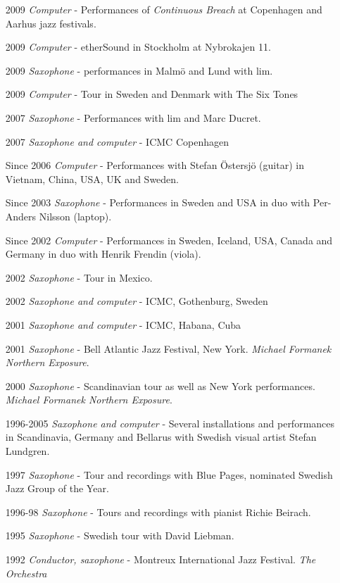\begin{enumerate}
\item [2009] \emph{Computer} - Performances of \emph{Continuous Breach} at Copenhagen and Aarhus jazz festivals.
\item [2009] \emph{Computer} - etherSound in Stockholm at Nybrokajen 11.
\item [2009] \emph{Saxophone} - performances in Malm\"o and Lund with lim.
\item [2009] \emph{Computer} - Tour in Sweden and Denmark with The Six Tones
\item [2007] \emph{Saxophone} - Performances with lim and Marc Ducret. 
\item [2007] \emph{Saxophone and computer} - ICMC Copenhagen
 \item[Since 2006] \emph{Computer} - Performances with Stefan \"Ostersj\"o (guitar) in Vietnam, China, USA, UK and Sweden.
 \item[Since 2003] \emph{Saxophone} - Performances in Sweden and USA in duo with Per-Anders
 Nilsson (laptop).
 \item[Since 2002] \emph{Computer} - Performances in Sweden, Iceland,
 USA, Canada and Germany in duo with Henrik Frendin (viola).
 \item[2002] \emph{Saxophone} - Tour in Mexico.
 \item[2002] \emph{Saxophone and computer} - ICMC, Gothenburg, Sweden
 \item[2001] \emph{Saxophone and computer} - ICMC, Habana, Cuba
 \item[2001] \emph{Saxophone} - Bell Atlantic Jazz Festival, New York. \emph{Michael Formanek
 Northern Exposure}.
 \item[2000] \emph{Saxophone} - Scandinavian tour as well as New York
 performances. \emph{Michael Formanek Northern Exposure}.
 \item[1996-2005] \emph{Saxophone and computer} - Several installations and performances in Scandinavia,
 Germany and Bellarus with Swedish visual artist Stefan Lundgren.
 \item[1997] \emph{Saxophone} - Tour and recordings with Blue Pages, nominated Swedish Jazz
 Group of the Year.
 \item[1996-98] \emph{Saxophone} - Tours and recordings with pianist Richie Beirach.
 \item[1995] \emph{Saxophone} - Swedish tour with David Liebman.
 \item[1992] \emph{Conductor, saxophone} - Montreux International Jazz Festival. \emph{The Orchestra}
\end{enumerate}

